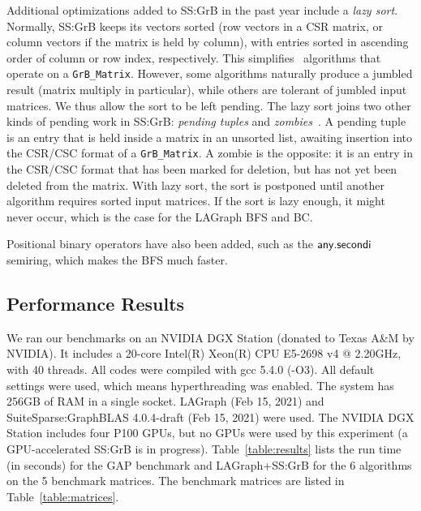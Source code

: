 Additional optimizations added to SS:GrB in the past year include a {\em lazy
sort}.  Normally, SS:GrB keeps its vectors sorted (row vectors in a CSR matrix,
or column vectors if the matrix is held by column), with entries sorted in
ascending order of column or row index, respectively.  This simplifies \
algorithms that operate on a \verb'GrB_Matrix'.  However, some algorithms
naturally produce a jumbled result (matrix multiply in particular), while others
are tolerant of jumbled input matrices.  We thus allow the sort to
be left pending.  The lazy sort joins two other kinds of pending work in
SS:GrB: {\em pending tuples} and {\em zombies}~\cite{DBLP:journals/toms/Davis19}.
A pending tuple is an entry
that is held inside a matrix in an unsorted list, awaiting insertion into the
CSR/CSC format of a \verb'GrB_Matrix'.  A zombie is the opposite: it is an
entry in the CSR/CSC format that has been marked for deletion, but has not yet
been deleted from the matrix.  With  lazy sort, the sort is postponed until
another algorithm requires sorted input matrices.  If the sort is lazy enough,
it might never occur, which is the case for the LAGraph BFS and BC.

Positional binary operators have also been added,
such as the $\mathbin{\mathsf{any.secondi}}$ semiring, %
which makes the BFS much faster.

\subsection{Performance Results}

We ran our benchmarks on an NVIDIA DGX Station (donated to Texas A\&M by
NVIDIA).  It includes a 20-core Intel(R) Xeon(R)
CPU E5-2698 v4 @ 2.20GHz, with 40 threads.  All codes were compiled with gcc
5.4.0 (-O3).  All default settings were used, which means  hyperthreading
was enabled.  The system has 256GB of RAM in a single socket.
LAGraph (Feb 15, 2021) and SuiteSparse:GraphBLAS 4.0.4-draft (Feb 15, 2021) were
used.  The NVIDIA DGX Station includes four P100 GPUs, but no GPUs were used by
this experiment (a GPU-accelerated SS:GrB is in progress).
Table~\ref{table:results} lists the run time (in seconds) for the GAP benchmark
and LAGraph+SS:GrB for the 6 algorithms on the 5 benchmark matrices.
The benchmark matrices are listed in Table~\ref{table:matrices}.

